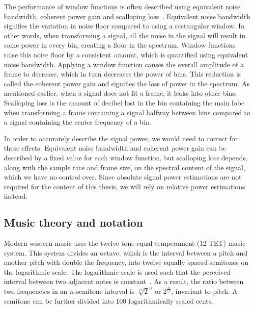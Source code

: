 \documentclass[a4paper,10pt,twocolumn]{article}
\begin{document}
The performance of window functions is often described using equivalent noise bandwidth, coherent power gain and scalloping loss~\cite{windowperf3, windowperf2}. Equivalent noise bandwidth signifies the variation in noise floor compared to using a rectangular window. In other words, when transforming a signal, all the noise in the signal will result in some power in every bin, creating a floor in the spectrum. Window functions raise this noise floor by a consistent amount, which is quantified using equivalent noise bandwidth.
%
Applying a window function causes the overall amplitude of a frame to decrease, which in turn decreases the power of bins. This reduction is called the coherent power gain and signifies the loss of power in the spectrum.
%
As mentioned earlier, when a signal does not fit a frame, it leaks into other bins. Scalloping loss is the amount of decibel lost in the bin containing the main lobe when transforming a frame containing a signal halfway between bins compared to a signal containing the center frequency of a bin.

In order to accurately describe the signal power, we would need to correct for these effects. Equivalent noise bandwidth and coherent power gain can be described by a fixed value for each window function, but scalloping loss depends, along with the sample rate and frame size, on the spectral content of the signal, which we have no control over. Since absolute signal power estimations are not required for the content of this thesis, we will rely on relative power estimations instead.


\vspace{+4mm}
\subsection{Music theory and notation}
Modern western music uses the twelve-tone equal temperament (12-TET) music system. This system divides an octave, which is the interval between a pitch and another pitch with double the frequency, into twelve equally spaced semitones on the logarithmic scale. The logarithmic scale is used such that the perceived interval between two adjacent notes is constant~\cite{perception}. As a result, the ratio between two frequencies in an $n$-semitone interval is $\sqrt[12]{2}^n$ or $2^{\frac{n}{12}}$, invariant to pitch. A semitone can be further divided into 100 logarithmically scaled cents. %
\end{document}
